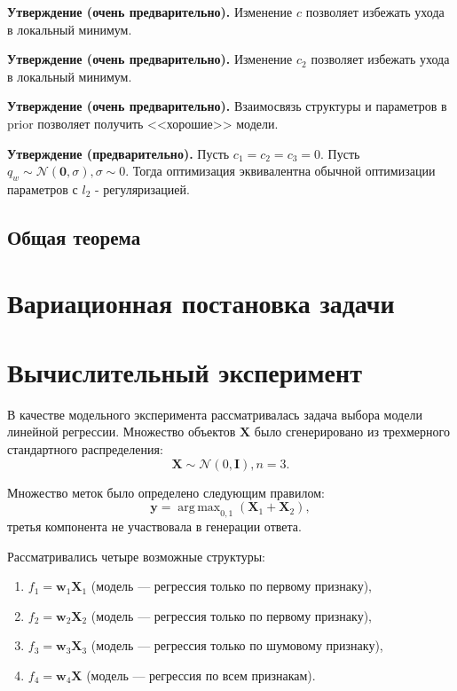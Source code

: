 \documentclass[12pt]{article}
\DeclareMathOperator*{\argmax}{arg\,max}
\begin{document}
\textbf{Утверждение (очень предварительно).} Изменение $c$ позволяет избежать ухода в локальный минимум. 

\textbf{Утверждение (очень предварительно).} Изменение $c_2$ позволяет избежать ухода в локальный минимум.

\textbf{Утверждение (очень предварительно).} Взаимосвязь структуры и параметров в prior позволяет получить <<хорошие>> модели.

\textbf{Утверждение (предварительно).} Пусть $c_1 = c_2 = c_3 = 0$. Пусть $q_w \sim \mathcal{N}(\mathbf{0}, \sigma), \sigma \sim 0$. 
Тогда оптимизация эквивалентна обычной оптимизации параметров с $l_2$ - регуляризацией.


\subsection{Общая теорема} 

\section{Вариационная постановка задачи}



\section{Вычислительный эксперимент}
В качестве модельного эксперимента рассматривалась задача выбора модели линейной регрессии.
Множество объектов $\mathbf{X}$ было сгенерировано из трехмерного стандартного распределения: 
\[
    \mathbf{X} \sim \mathcal{N}(0, \mathbf{I}), n = 3.
\]

Множество меток было определено следующим правилом:
\[
    \mathbf{y}= \argmax_{0,1} (\mathbf{X}_1 + \mathbf{X}_2),
\]
третья компонента не участвовала в генерации ответа.

Рассматривались четыре возможные структуры:
\begin{enumerate}
\item $f_1 = \mathbf{w}_1 \mathbf{X}_1$ (модель --- регрессия только по первому признаку), 

\item $f_2 = \mathbf{w}_2 \mathbf{X}_2$ (модель --- регрессия только по первому признаку), 

\item $f_3 = \mathbf{w}_3 \mathbf{X}_3$ (модель --- регрессия только по шумовому признаку), 

\item $f_4 = \mathbf{w}_4 \mathbf{X}$ (модель --- регрессия по всем признакам). 
\end{enumerate}
\end{document}
